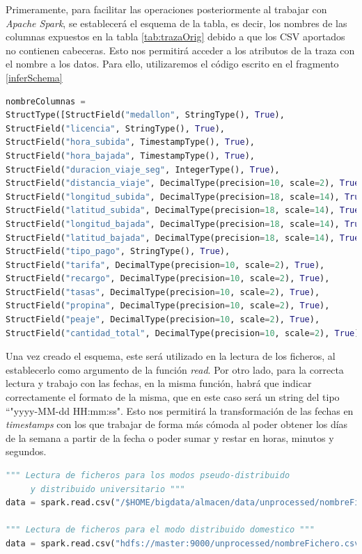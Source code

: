 Primeramente, para facilitar las operaciones posteriormente al trabajar con \textit{Apache Spark}, se establecerá el esquema de la tabla, es decir, los nombres de las columnas expuestos en la tabla \ref{tab:trazaOrig} debido a que los \gls{CSV} aportados no contienen cabeceras. Esto nos permitirá acceder a los atributos de la traza con el nombre a los datos. Para ello, utilizaremos el código escrito en el fragmento \ref{inferSchema}

\begin{lstlisting}[label=inferSchema,language=Python,frame=single,caption=Código para establecer el esquema del \gls{CSV} y facilitar el acceso a los atributos]
nombreColumnas = 
StructType([StructField("medallon", StringType(), True),
StructField("licencia", StringType(), True),
StructField("hora_subida", TimestampType(), True),
StructField("hora_bajada", TimestampType(), True),
StructField("duracion_viaje_seg", IntegerType(), True),
StructField("distancia_viaje", DecimalType(precision=10, scale=2), True),
StructField("longitud_subida", DecimalType(precision=18, scale=14), True),
StructField("latitud_subida", DecimalType(precision=18, scale=14), True),
StructField("longitud_bajada", DecimalType(precision=18, scale=14), True),
StructField("latitud_bajada", DecimalType(precision=18, scale=14), True),
StructField("tipo_pago", StringType(), True),
StructField("tarifa", DecimalType(precision=10, scale=2), True),
StructField("recargo", DecimalType(precision=10, scale=2), True),
StructField("tasas", DecimalType(precision=10, scale=2), True),
StructField("propina", DecimalType(precision=10, scale=2), True),
StructField("peaje", DecimalType(precision=10, scale=2), True),
StructField("cantidad_total", DecimalType(precision=10, scale=2), True)])
\end{lstlisting}

Una vez creado el esquema, este será utilizado en la lectura de los ficheros, al establecerlo como argumento de la función \textit{read}. Por otro lado, para la correcta lectura y trabajo con las fechas, en la misma función, habrá que indicar correctamente el formato de la misma, que en este caso será un string del tipo ``"yyyy-MM-dd HH:mm:ss". Esto nos permitirá la transformación de las fechas en \textit{timestamps} con los que trabajar de forma más cómoda al poder obtener los días de la semana a partir de la fecha o poder sumar y restar en horas, minutos y segundos.

\begin{lstlisting}[label=readCSV,language=python,frame=single,caption=Código para leer los ficheros \gls{CSV}]
""" Lectura de ficheros para los modos pseudo-distribuido
     y distribuido universitario """
data = spark.read.csv("/$HOME/bigdata/almacen/data/unprocessed/nombreFichero.csv", schema=nombreColumnas, timestampFormat="yyyy-MM-dd HH:mm:ss")

""" Lectura de ficheros para el modo distribuido domestico """
data = spark.read.csv("hdfs://master:9000/unprocessed/nombreFichero.csv", schema=nombreColumnas, timestampFormat="yyyy-MM-dd HH:mm:ss")
\end{lstlisting}

